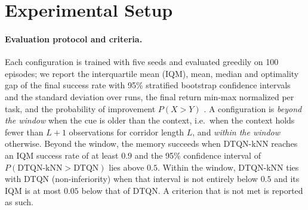 \section{Experimental Setup}
\label{sec:experimental-setup}

\paragraph{Evaluation protocol and criteria.}
Each configuration is trained with five seeds and evaluated greedily on 100
episodes; we report the interquartile mean (IQM), mean, median and optimality gap
of the final success rate with 95\% stratified bootstrap confidence intervals and
the standard deviation over runs, the final return min-max normalized per task,
and the probability of improvement $P(X > Y)$ \cite{agarwal2021rliable}.
A configuration is \emph{beyond the window} when the cue is older than the
context, i.e.\ when the context holds fewer than $L + 1$ observations for
corridor length $L$, and \emph{within the window} otherwise. Beyond the window,
the memory succeeds when DTQN-kNN reaches an IQM success rate of at least $0.9$
and the 95\% confidence interval of $P(\text{DTQN-kNN} > \text{DTQN})$ lies
above $0.5$. Within the window, DTQN-kNN ties with DTQN (non-inferiority) when
that interval is not entirely below $0.5$ and its IQM is at most $0.05$ below
that of DTQN. A criterion that is not met is reported as such.

